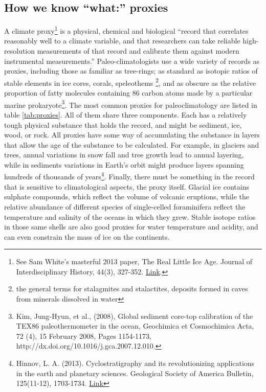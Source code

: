 \subsection{How we know ``what:'' proxies}
A climate proxy\footnote{See Sam White's masterful 2013 paper, The Real Little Ice Age. Journal of Interdisciplinary History, 44(3), 327-352. \href{https://doi.org/10.1162/JINH_a_00574}{Link}.} is a
physical, chemical and biological ``record that correlates reasonably well to a climate variable, and that researchers can take reliable high-resolution measurements of that record and calibrate them against modern instrumental measurements.'' Paleo-climatologists use a wide variety of records as proxies, including those as familiar as tree-rings; as standard as isotopic ratios of stable elements in ice cores, corals, speleothems \footnote{the general terms for stalagmites and stalactites, deposits formed in caves from minerals dissolved in water}, and as obscure as the relative proportion of fatty molecules containing 86 carbon atoms made by a particular marine prokaryote\footnote{Kim, Jung-Hyun, et al., (2008), Global sediment core-top calibration of the TEX86 paleothermometer in the ocean, Geochimica et Cosmochimica Acta, 72 (4), 15 February 2008, Pages 1154-1173, http://dx.doi.org/10.1016/j.gca.2007.12.010.}. The most common proxies for paleoclimatology are listed in table \ref{tab:proxies}. All of them share three components. Each has a relatively tough physical substance that holds the record, and  might be sediment, ice, wood, or rock. All proxies have some way of accumulating the substance in layers that allow the age of the substance to be calculated. For example, in glaciers and trees, annual variations in snow fall and tree growth lead to annual layering, while in sediments variations in Earth's orbit might produce layers spanning hundreds of thousands of years\footnote{Hinnov, L. A. (2013). Cyclostratigraphy and its revolutionizing applications in the earth and planetary sciences. Geological Society of America Bulletin, 125(11-12), 1703-1734. \href{https://doi.org/10.1130/B30934.1}{Link}}. Finally, there must be something in the record that is sensitive to climatological aspects, the proxy itself. Glacial ice contains sulphate compounds, which reflect the volume of volcanic eruptions, while the relative abundance of different species of single-celled foraminifera reflect the temperature and salinity of the oceans in which they grew. Stable isotope ratios in those same shells are also good proxies for water temperature and acidity, and can even constrain the mass of ice on the continents.    

